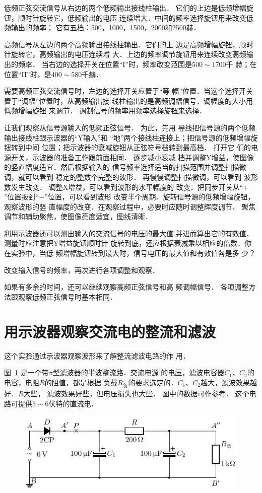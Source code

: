 低频正弦交流信号从右边的两个低频输出接线柱输出．
它们的上边是低频增幅旋钮，顺时针旋转它，低频输出的电压
连续增大．中间的频率选择旋钮用来改变低频输出的频率；
它有五档：500，1000，1500，2000和2500赫．

高频信号从左边的两个高频输出接线柱输出．它们的上
边是高频增幅旋钮，顺时针旋转它，高频输出的电压连续增
大．上边的频率调节旋钮用来连续改变高频输出的频率．
当右边的选择开关在位置“I”时，频率改变范围是$500 \sim 1700$千
赫；在位置“II”时，是$400 \sim 580$千赫．

需要高频正弦交流信号时，左边的选择开关应置于“等
幅”位置．当这个选择开关置于“调幅”位置时，从高频输出接
线柱输出的是高频调幅信号．调幅度的大小用低频增幅旋钮
来调节．
调制信号的频率用频率选择旋钮来选择．

让我们观察从信号源输入的低频正弦信号．
为此，先用
导线把信号源的两个低频输出接线柱跟示波器的“Y输入”和
“地”两个接线柱连接上；把信号源的低频增幅旋钮转到中间
位置；把示波器的衰减旋钮从正弦符号档转到最高档．
打开它
们的电源开关，示波器的准备工作跟前面相同．
逐步减小衰减
档并调整Y增益，使图像的竖直幅度适宜．然后根据输入的
信号频率选择适当的扫描范围并调整扫描微调，就可以看到
稳定的整数个完整的波形．
再慢慢调整扫描微调，可以看到
波形数发生改变．
调整X增益，可以看到波形的水平幅度的
改变．把同步开关从“$+$”位置扳到“$-$”位置，可以看到波形
改变半个周期．旋转信号源的低频增幅旋钮，观察波形的竖
直幅度的改变．在观察过程中，必要时应随时调整辉度调节、
聚焦调节和辅助聚焦，使图像亮度适宜，图线清晰．

利用示波器还可以测出输入的交流信号的电压的最大值
并进而算出它的有效值．测量时应注意把Y增益旋钮顺时针
旋转到底，还应根据衰减乘以相应的倍数．你在实验中，当低
频增幅旋钮转到最大时，信号电压的最大值和有效值各是多
少？

改变输入信号的频率，再次进行各项调整和观察．

如果有多余的时间，还可以继续观察高频正弦信号和高
频调幅信号．
各项调整方法跟观察低频正弦信号时基本相同．

\section{用示波器观察交流电的整流和滤波}\label{sec_C_app_01-4}

这个实验通过示波器观察波形来了解整流滤波电路的作
用．

图~\ref{fig_C_10-4} 是一个带$\pi$型滤波器的半波整流路．交流电源
的电压，滤波电容器$C_1$、$C_2$的电容，电阻$R$的阻值，都是根据
负载$R_{\text{负}}$的要求选定的．$C_1$、$C_2$越大，滤波效果越好．$R$大些，
滤波效果好些，但电压损失也大些．
图中的数据可作参考．
这个电路可提供$5 \sim 6$伏特的直流电．
\begin{figure}[htbp]
    \centering
    \includegraphics{fig/C/10-4.pdf}
    \caption{}\label{fig_C_10-4}
\end{figure}

